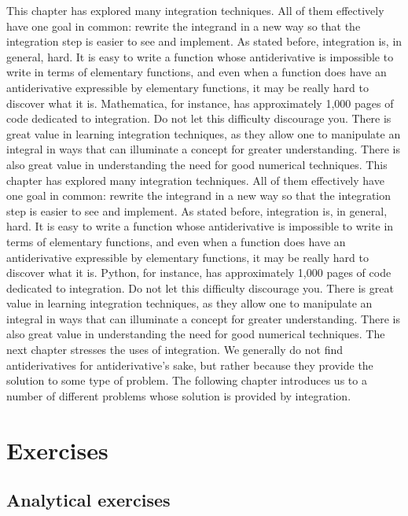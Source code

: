 
\fi

\ifmathematica
This chapter has explored many integration techniques.  All of them effectively have one goal in common: rewrite the integrand in a new way so that the integration step is easier to see and implement. As stated before, integration is, in general, hard. It is easy to write a function whose antiderivative is impossible to write in terms of elementary functions, and even when a function does have an antiderivative expressible by elementary functions, it may be really hard to discover what it is. Mathematica, for instance, has approximately 1,000 pages of code dedicated to integration. Do not let this difficulty discourage you. There is great value in learning integration techniques, as they allow one to manipulate an integral in ways that can illuminate a concept for greater understanding. There is also great value in understanding the need for good numerical techniques.
\fi
\ifpython
This chapter has explored many integration techniques.  All of them effectively have one goal in common: rewrite the integrand in a new way so that the integration step is easier to see and implement. As stated before, integration is, in general, hard. It is easy to write a function whose antiderivative is impossible to write in terms of elementary functions, and even when a function does have an antiderivative expressible by elementary functions, it may be really hard to discover what it is. Python, for instance, has approximately 1,000 pages of code dedicated to integration. Do not let this difficulty discourage you. There is great value in learning integration techniques, as they allow one to manipulate an integral in ways that can illuminate a concept for greater understanding. There is also great value in understanding the need for good numerical techniques.
\fi
The next chapter stresses the uses of integration. We generally do not find antiderivatives for antiderivative's sake, but rather because they provide the solution to some type of problem. The following chapter introduces us to a number of different problems whose solution is provided by integration.


 
\newpage
\section{Exercises}
\subsection{Analytical exercises}

